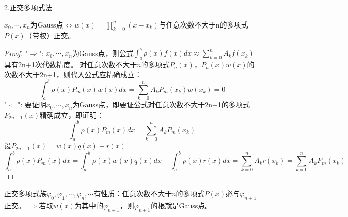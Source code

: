 2.正交多项式法
\begin{theorem}
    $x_0,\cdots,x_n$为Gauss点$\Leftrightarrow w(x) = \prod_{k=0}^{n}(x-x_k)$与任意次数不大于n的多项式$P(x)$（带权）正交。
\end{theorem}
\begin{proof}
    "$\Rightarrow$":
    $x_0,\cdots,x_n$为Gauss点，则公式$\int_{a}^{b}\rho(x)f(x)dx\approx \sum_{k=0}^{n}A_kf(x_k)$具有2n+1次代数精度。
    对任意次数不大于$n$的多项式$P_n(x)$，$P_n(x)w(x)$的次数不大于2n+1，则代入公式应精确成立：
    \begin{equation*}
        \int_{a}^{b}\rho(x)P_m(x)w(x)dx = \sum_{k=0}^{n}A_kP_m(x_k)w(x_k) = 0
    \end{equation*}
    "$\Leftarrow$":
    要证明$x_0,\cdots,x_n$为Gauss点，即要证公式对任意次数不大于2n+1的多项式$P_{2n+1}(x)$精确成立，即证明：
    \begin{equation*}
        \int_{a}^{b}\rho(x)P_m(x)dx = \sum_{k=0}^{n}A_kP_m(x_k)
    \end{equation*}
    设$P_{2n+1}(x) = w(x)q(x)+r(x)$
    \begin{equation*}
        \int_{a}^{b}\rho(x)P_m(x)dx = \int_{a}^{b}\rho(x)w(x)q(x)dx + \int_{a}^{b}\rho(x)r(x)dx = \sum_{k=0}^{n}A_kr(x_k) = \sum_{k=0}^{n}A_kP_m(x_k)
    \end{equation*}
\end{proof}

正交多项式族${\varphi_0,\varphi_1,\cdots,\varphi_n,\cdots}$有性质：任意次数不大于$n$的多项式$P(x)$必与$\varphi_{n+1}$正交。
$\Rightarrow$若取$w(x)$为其中的$\varphi_{n+1}$，则$\varphi_{n+1}$的根就是Gauss点。

